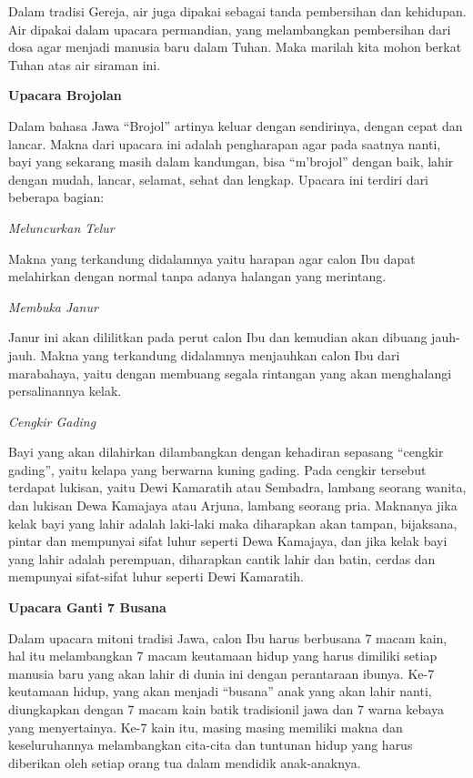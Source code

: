 \documentclass[a5paper,headsepline,titlepage,10pt,nnormalheadings,DIVcalc,twoside]{scrbook}
\begin{document}
{Dalam tradisi Gereja, air juga dipakai sebagai tanda pembersihan dan kehidupan. Air dipakai dalam upacara permandian, yang melambangkan pembersihan dari dosa agar menjadi manusia baru dalam Tuhan. Maka marilah kita mohon berkat Tuhan atas air siraman ini.
 
{\bf Upacara Brojolan}

Dalam bahasa Jawa “Brojol” artinya keluar dengan sendirinya, dengan cepat dan lancar. Makna dari upacara ini adalah pengharapan agar pada saatnya nanti, bayi yang sekarang masih dalam kandungan, bisa “m’brojol” dengan baik, lahir dengan mudah, lancar, selamat, sehat dan lengkap. Upacara ini terdiri dari beberapa bagian:
 
\textit{Meluncurkan Telur}

Makna yang terkandung didalamnya yaitu harapan agar calon Ibu dapat melahirkan dengan normal tanpa adanya halangan yang merintang.
 
\textit{Membuka Janur}

Janur ini akan dililitkan pada perut calon Ibu dan kemudian akan dibuang jauh-jauh. Makna yang terkandung didalamnya menjauhkan calon Ibu dari marabahaya, yaitu dengan membuang segala rintangan yang akan menghalangi persalinannya kelak.
 
\textit{Cengkir Gading}

Bayi yang akan dilahirkan dilambangkan dengan kehadiran sepasang “cengkir gading”, yaitu kelapa yang berwarna kuning gading. Pada cengkir tersebut terdapat lukisan, yaitu Dewi Kamaratih atau Sembadra, lambang seorang wanita, dan lukisan Dewa Kamajaya atau Arjuna, lambang seorang pria. Maknanya jika kelak bayi yang lahir adalah laki-laki maka diharapkan akan tampan, bijaksana, pintar dan mempunyai sifat luhur seperti Dewa Kamajaya, dan jika kelak bayi yang lahir adalah perempuan, diharapkan cantik lahir dan batin, cerdas dan mempunyai sifat-sifat luhur seperti Dewi Kamaratih.
 
{\bf Upacara Ganti 7 Busana}

Dalam upacara mitoni tradisi Jawa, calon Ibu harus berbusana 7 macam kain, hal itu melambangkan 7 macam keutamaan hidup yang harus dimiliki setiap manusia baru yang akan lahir di dunia ini dengan perantaraan ibunya. Ke-7 keutamaan hidup, yang akan menjadi “busana” anak yang akan lahir nanti, diungkapkan dengan 7 macam kain batik tradisionil jawa dan 7 warna kebaya yang menyertainya. Ke-7 kain itu, masing masing memiliki makna dan keseluruhannya melambangkan cita-cita dan tuntunan hidup yang harus diberikan oleh setiap orang tua dalam mendidik anak-anaknya.
 
}
\end{document}
